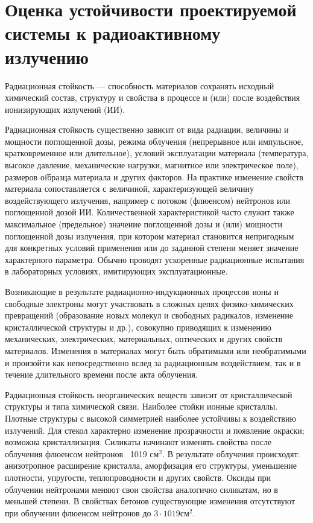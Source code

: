 \section{Оценка устойчивости проектируемой системы к радиоактивному излучению}

Радиационная стойкость --- способность материалов сохранять исходный химический состав, структуру и свойства в процессе и (или) после воздействия ионизирующих излучений (ИИ).

Радиационная стойкость существенно зависит от вида радиации, величины и мощности поглощенной дозы, режима облучения (непрерывное или импульсное, кратковременное или длительное), условий эксплуатации материала (температура, высокое давление, механические нагрузки, магнитное или электрическое поле), размеров оfбразца материала и других факторов. На практике изменение свойств материала сопоставляется с величиной, характеризующей величину воздействующего излучения, например с потоком (флюенсом) нейтронов или поглощенной дозой ИИ. Количественной характеристикой часто служит также максимальное (предельное) значение поглощенной дозы и (или) мощности поглощенной дозы излучения, при котором материал становится непригодным для конкретных условий применения или до заданной степени меняет значение характерного параметра. Обычно проводят ускоренные радиационные испытания в лабораторных условиях, имитирующих эксплуатационные.

Возникающие в результате радиационно-индукционных процессов ионы и свободные электроны могут участвовать в сложных цепях физико-химических превращений (образование новых молекул и свободных радикалов, изменение кристаллической структуры и др.), совокупно приводящих к изменению механических, электрических, материальных, оптических и других свойств материалов. Изменения в материалах могут быть обратимыми или необратимыми и произойти как непосредственно вслед за радиационным воздействием, так и в течение длительного времени после акта облучения.

Радиационная стойкость неорганических веществ зависит от кристаллической структуры и типа химической связи. Наиболее стойки ионные кристаллы. Плотные структуры с высокой симметрией наиболее устойчивы к воздействию излучений. Для стекол характерно изменение прозрачности и появление окраски; возможна кристаллизация. Силикаты начинают изменять свойства после облучения флюенсом нейтронов ~1019 $\textrm{см}^2$. В результате облучения происходят: анизотропное расширение кристалла, аморфизация его структуры, уменьшение плотности, упругости, теплопроводности и других свойств. Оксиды при облучении нейтронами меняют свои свойства аналогично силикатам, но в меньшей степени. В свойствах бетонов существующие изменения отсутствуют при облучении флюенсом нейтронов до $3 \cdot 1019 \textrm{см}^2$.

